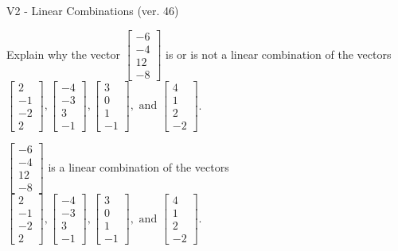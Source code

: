\begin{exercise}
  \begin{exerciseTitle}V2 - Linear Combinations (ver. 46)\end{exerciseTitle}
  \begin{exerciseStatement}
    Explain why the vector \(\left[\begin{array}{c}
-6 \\
-4 \\
12 \\
-8
\end{array}\right]\)  is or is not a linear 
	combination of the vectors \(\left[\begin{array}{c}
2 \\
-1 \\
-2 \\
2
\end{array}\right] , \left[\begin{array}{c}
-4 \\
-3 \\
3 \\
-1
\end{array}\right] , \left[\begin{array}{c}
3 \\
0 \\
1 \\
-1
\end{array}\right] , \text{ and } \left[\begin{array}{c}
4 \\
1 \\
2 \\
-2
\end{array}\right]\).
	


  \end{exerciseStatement}
  \begin{exerciseAnswer}
   \(\left[\begin{array}{c}
-6 \\
-4 \\
12 \\
-8
\end{array}\right]\) 
  	 is  
	a linear combination of the vectors \(\left[\begin{array}{c}
2 \\
-1 \\
-2 \\
2
\end{array}\right] , \left[\begin{array}{c}
-4 \\
-3 \\
3 \\
-1
\end{array}\right] , \left[\begin{array}{c}
3 \\
0 \\
1 \\
-1
\end{array}\right] , \text{ and } \left[\begin{array}{c}
4 \\
1 \\
2 \\
-2
\end{array}\right]\).


\end{exerciseAnswer}
\end{exercise}
